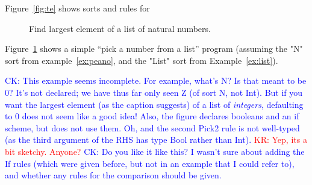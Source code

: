 \documentclass[letterpaper,11pt]{article}
\newcommand{\CK}[1]{\textcolor{blue}{CK: #1}}
\newcommand{\KR}[1]{\textcolor{red}{KR: #1}}
\newcommand{\LV}[1]{\textcolor{green}{LV: #1}}
\begin{document}
\begin{example}\label{ex:te}
  Figure~\ref{fig:te} shows sorts and rules for 
\end{example}

\begin{figure}[h!t]
  \caption{Find largest element of a list of natural numbers.}
  \label{fig:pick}
\end{figure}

\begin{example}[]\label{ex:pick}
  Figure~\ref{fig:pick} shows a simple ``pick a number from a list'' program
  (assuming the "N" sort from example~\ref{ex:peano}, and the "List" sort from
  Example~\ref{ex:list}).

  \CK{This example seems incomplete.  For example, what's N? Is that meant to
  be 0? It's not declared; we have thus far only seen Z (of sort N, not Int).
  But if you want the largest element (as the caption suggests) of a list of
  \emph{integers}, defaulting to 0 does not seem like a good idea!  Also, the
  figure declares booleans and an if scheme, but does not use them.  Oh, and
  the second Pick2 rule is not well-typed (as the third argument of the RHS
  has type Bool rather than Int).}
  \KR{Yep, its a bit sketchy. Anyone?}
  \CK{Do you like it like this? I wasn't sure about adding the If rules (which
  were given before, but not in an example that I could refer to), and whether
  any rules for the comparison should be given.}
\end{example}
\end{document}

